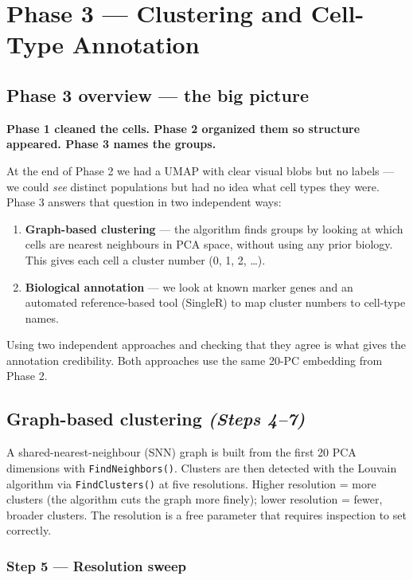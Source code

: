 \documentclass[11pt, a4paper]{article}
\begin{document}
\section{Phase 3 — Clustering and Cell-Type Annotation}

\subsection{Phase 3 overview — the big picture}

\textbf{Phase 1 cleaned the cells. Phase 2 organized them so structure appeared. Phase 3 names the groups.}

At the end of Phase 2 we had a UMAP with clear visual blobs but no labels — we could
\textit{see} distinct populations but had no idea what cell types they were.
Phase 3 answers that question in two independent ways:

\begin{enumerate}[nosep]
  \item \textbf{Graph-based clustering} — the algorithm finds groups by looking at which
        cells are nearest neighbours in PCA space, without using any prior biology.
        This gives each cell a cluster number (0, 1, 2, \ldots).
  \item \textbf{Biological annotation} — we look at known marker genes and an automated
        reference-based tool (SingleR) to map cluster numbers to cell-type names.
\end{enumerate}

Using two independent approaches and checking that they agree is what gives the
annotation credibility. Both approaches use the same 20-PC embedding from Phase 2.

\subsection{Graph-based clustering \small\normalfont\textit{(Steps 4–7)}}

A shared-nearest-neighbour (SNN) graph is built from the first 20 PCA dimensions with
\texttt{FindNeighbors()}. Clusters are then detected with the Louvain algorithm via
\texttt{FindClusters()} at five resolutions. Higher resolution = more clusters (the
algorithm cuts the graph more finely); lower resolution = fewer, broader clusters.
The resolution is a free parameter that requires inspection to set correctly.

\subsubsection*{Step 5 — Resolution sweep}
\end{document}
